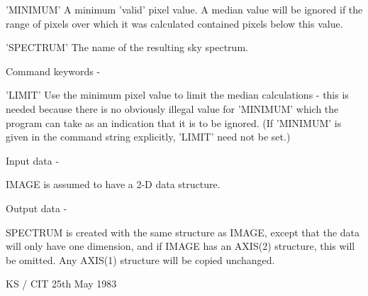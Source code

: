 \begin{description}
\begin{terminalv}
 'MINIMUM'  A minimum 'valid' pixel value.  A median value
            will be ignored if the range of pixels over which it
            was calculated contained pixels below this value.

 'SPECTRUM' The name of the resulting sky spectrum.

 Command keywords -

 'LIMIT'    Use the minimum pixel value to limit the median
            calculations - this is needed because there is no
            obviously illegal value for 'MINIMUM' which the
            program can take as an indication that it is to be
            ignored.  (If 'MINIMUM' is given in the command
            string explicitly, 'LIMIT' need not be set.)

 Input data -

 IMAGE is assumed to have a 2-D data structure.

 Output data -

 SPECTRUM is created with the same structure as IMAGE,
 except that the data will only have one dimension, and if
 IMAGE has an AXIS(2) structure, this will be omitted.  Any
 AXIS(1) structure will be copied unchanged.

                                 KS / CIT 25th May 1983
\end{terminalv}
\end{description}

